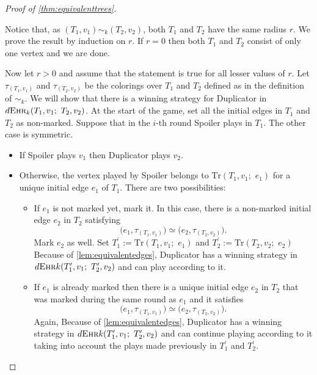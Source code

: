 \documentclass[12pt,notitlepage,a4paper]{article}
\theoremstyle{definition}
\newcommand{\morph}[1]{\sim_#1}
\newcommand{\ehr}{\textsc{Ehr}}
\begin{document}
\begin{proof}[Proof of \cref{thm:equivalenttrees}]~ \par
	Notice that, as $(T_1,v_1)\morph{k} (T_2,v_2)$, both $T_1$ and
	$T_2$ have the same radius $r$.
	We prove the result by induction on $r$.
	If $r=0$ then both $T_1$ and $T_2$ consist
	of only one vertex and we are done. \par
	Now let $r>0$ and assume that the 
	statement is true for all lesser values of $r$.
	Let $\tau_{(T_1,v_1)}$ and $\tau_{(T_2,v_2)}$ 
	be the colorings over $T_1$ and $T_2$ defined as in 
	the definition of $\sim_k$. 
	We will show that there is a winning strategy 
	for Duplicator in
	$d\ehr_k(T_1,v_1;\,\, T_2,v_2)$.
	At the start of the game, set all the initial edges
	in $T_1$ and $T_2$ as non-marked. 
	Suppose that in the $i$-th round Spoiler plays in 
	$T_1$. The other case is symmetric. 
	\begin{itemize}
		\item If Spoiler plays $v_1$ then Duplicator plays $v_2$.
		\item Otherwise, the vertex played by Spoiler belongs to
		$\mathrm{Tr}(T_1,v_1;\,\,e_1)$
		for a unique initial edge $e_1$ of $T_1$. 
		There are two possibilities:
		\begin{itemize}
			\item If $e_1$ is not marked yet, mark it. 
			In this case, there is a 
			non-marked initial
			edge $e_2$ in $T_2$ satisfying 
			\[
			\big(e_1,\tau_{(T_1,v_1)}\big)\simeq
			\big(e_2,\tau_{(T_2,v_2)}  \big).\]
			Mark $e_2$ as well. 
			Set $T^\prime_1:=\mathrm{Tr}(T_1,v_1;\,\,e_1)$
			and
			$T^\prime_2:=\mathrm{Tr}(T_2,v_2;\,\,e_2)$
			Because of
			\cref{lem:equivalentedges}, Duplicator
			has a winning strategy in
			$ d\ehr{k}(T^\prime_1, v_1; \,\, T^\prime_2,v_2)$
			and can play according to it.
			\item If $e_1$ is already marked then there is
			a unique initial edge $e_2$ in $T_2$ that was 
			marked during the same round as $e_1$ and it satisfies 
			\[
			\big(e_1,\tau_{(T_1,v_1)}\big)\simeq
			\big(e_2,\tau_{(T_2,v_2)}  \big).\]	
			Again, 
			Because of
			\cref{lem:equivalentedges}, Duplicator
			has a winning strategy in
			$d\ehr{k}(T^\prime_1, v_1; \,\, T^\prime_2,v_2)$
			and can continue playing according to it taking
			into account the plays made previously in 
			$T^\prime_1$ and $T^\prime_2$.	
		\end{itemize}
	\end{itemize}
\end{proof}
\end{document}
